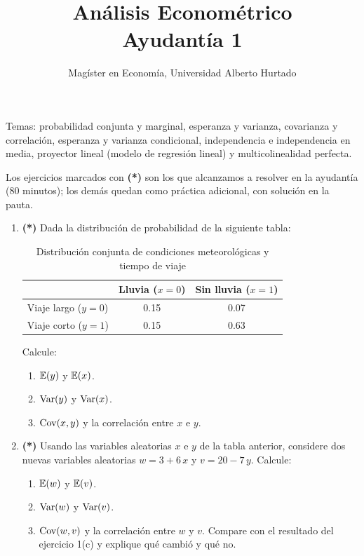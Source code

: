 \documentclass[letterpaper,11pt]{article}
\title{Análisis Econométrico \\ Ayudantía 1}
\author{Magíster en Economía, Universidad Alberto Hurtado}
\date{}
\begin{document}
\maketitle

\noindent Temas: probabilidad conjunta y marginal, esperanza y varianza, covarianza y correlación,
esperanza y varianza condicional, independencia e independencia en media, proyector lineal
(modelo de regresión lineal) y multicolinealidad perfecta.

\medskip
\noindent Los ejercicios marcados con \textbf{(*)} son los que alcanzamos a resolver en la
ayudantía (80 minutos); los demás quedan como práctica adicional, con solución en la pauta.

\begin{enumerate}[itemsep=1.2em]

\item \textbf{(*)} Dada la distribución de probabilidad de la siguiente tabla:
    \begin{table}[!htbp]
        \centering
        \caption{Distribución conjunta de condiciones meteorológicas y tiempo de viaje}
        \begin{tabular}{lcc}
            \toprule
            & Lluvia ($x=0$) & Sin lluvia ($x=1$) \\
            \midrule
            Viaje largo ($y=0$) & 0.15 & 0.07 \\
            Viaje corto ($y=1$) & 0.15 & 0.63 \\
            \bottomrule
        \end{tabular}
    \end{table}

    Calcule:
    \begin{enumerate}
        \item $\operatorname{\mathbb{E}}(y)$ y $\operatorname{\mathbb{E}}(x)$.
        \item $\operatorname{Var}(y)$ y $\operatorname{Var}(x)$.
        \item $\operatorname{Cov}(x,y)$ y la correlación entre $x$ e $y$.
    \end{enumerate}

\item \textbf{(*)} Usando las variables aleatorias $x$ e $y$ de la tabla anterior, considere dos nuevas
    variables aleatorias $w = 3 + 6\,x$ y $v = 20 - 7\,y$. Calcule:
    \begin{enumerate}
        \item $\operatorname{\mathbb{E}}(w)$ y $\operatorname{\mathbb{E}}(v)$.
        \item $\operatorname{Var}(w)$ y $\operatorname{Var}(v)$.
        \item $\operatorname{Cov}(w,v)$ y la correlación entre $w$ y $v$. Compare con el resultado del
              ejercicio 1(c) y explique qué cambió y qué no.
    \end{enumerate}


\end{enumerate}
\end{document}
